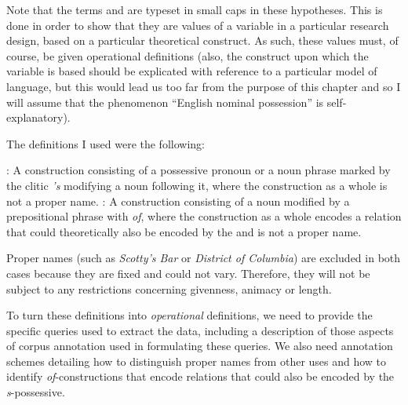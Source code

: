 Note that the terms   and  are typeset in small caps in these hypotheses.  This is done in order to show that they are values of a variable in a particular research design,  based on a particular theoretical construct. As such, these values must, of course, be given operational  definitions (also, the construct upon which the variable is based should be explicated with reference to a particular model of language, but this would lead us too far from the purpose of this chapter and so I will assume that the phenomenon ``English nominal  possession'' is self\hyp{}explanatory).

The definitions I used were the following:

\begin{exe}
\ex
\begin{xlist}
\label{ex:sgenofcdefinition}
\ex {}:  A construction consisting of a possessive pronoun  or a noun  phrase marked by the clitic  \textit{'s} modifying a noun following it, where the construction as a whole is not a proper name.
\ex {}: A construction consisting of a noun modified by a prepositional  phrase with \textit{of}, where the construction as a whole encodes a relation that could theoretically also be encoded by the  and is not a proper name.
\end{xlist}
\end{exe}

Proper names (such as \textit{Scotty's Bar} or \textit{District of Columbia}) are excluded in both cases because they are fixed and could not vary. Therefore, they will not be subject to any restrictions concerning givenness,  animacy  or  length.

To turn these definitions into \emph{operational}  definitions, we need to provide the specific queries  used to extract  the data, including a description of those aspects of corpus annotation  used in formulating these queries. We also need annotation schemes detailing how to distinguish proper names from other uses and how to identify \textit{of}-constructions that encode relations that could also be encoded by the  \textit{s}-possessive.

